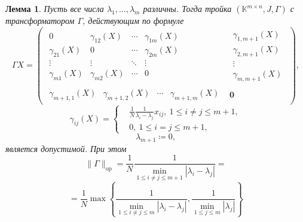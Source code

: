 \documentclass[12pt]{article}
\newtheorem{ksvlem}[ksvthm]{Лемма}
\theoremstyle{definition}
\begin{document}
\begin{ksvlem}
    Пусть все числа \( \lambda_1, \ldots, \lambda_m \) различны.
    Тогда тройка \( (\mathbb{K}^{m{\times}n}, J, \Gamma) \)
    с трансформатором \( \Gamma \), действующим по формуле
    \[
        \Gamma X =
        \left(\begin{array}{c|c}
            \begin{matrix}
                0               & \gamma_{12}(X) & \cdots & \gamma_{1m}(X) \\
                \gamma_{21}(X)  & 0              & \cdots & \gamma_{2m}(X) \\
                \vdots          & \vdots         & \ddots & \vdots & \ \\
                \gamma_{m1}(X)  & \gamma_{m2}(X) & \cdots & 0
            \end{matrix} &
            \begin{matrix}
                \gamma_{1,m+1}(X) \\
                \gamma_{2,m+1}(X) \\
                \vdots \\
                \gamma_{m,m+1}(X)
            \end{matrix} \\ \hline
            \begin{matrix}
                \gamma_{m{+}1,1}(X) &
                \gamma_{m{+}1,2}(X) &
                \cdots &
                \gamma_{m{+}1,m}(X)
            \end{matrix} &
            \mathbf{0}
        \end{array}\right),
        \]
    \[
        \gamma_{ij}(X) =
        \left\{\begin{aligned}
            & \frac1N \frac{1}{\lambda_i - \lambda_j} x_{ij},
              \ 1\leq i{\neq}j \leq m{+}1, \\
            & 0,
              \ 1\leq i{=}j \leq m{+}1,
        \end{aligned}\right.
        \]
    \[
        \lambda_{m+1} \coloneqq 0,
        \]
    является допустимой.
    При этом
    \[
        \|\Gamma\|_{\mathrm{op}} =
        \frac1N
        \frac{1}{\min_{1\leq i{\neq}j \leq m{+}1}|\lambda_i - \lambda_j|} =
        \]
    \[
        = \frac1N
         \max\left\{
         \frac{1}{
             \min\limits_{1\leq i{\neq}j \leq m }{|\lambda_i - \lambda_j|}},
         \frac{1}{
             \min\limits_{1\leq j \leq m}{|\lambda_j|}}
         \right\}
        \]
\end{ksvlem}
\end{document}
